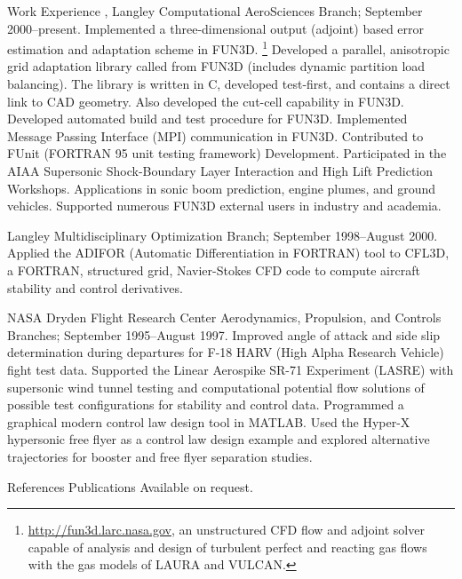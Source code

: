 \documentclass{resume}
\begin{document}
\begin{category}{Work Experience}
, Langley Computational AeroSciences Branch;
September 2000--present.
Implemented a three-dimensional output (adjoint) based error
estimation and adaptation scheme in FUN3D.%
\footnote{\url{http://fun3d.larc.nasa.gov}, an unstructured CFD flow and adjoint solver capable of analysis and
design of turbulent perfect and reacting gas flows with the gas models of LAURA and VULCAN.
} 
Developed a parallel, anisotropic grid adaptation
library called from FUN3D (includes dynamic partition load balancing).
The library is
written in C, developed test-first, and contains a direct link to CAD geometry.
Also developed the cut-cell capability in FUN3D.
Developed automated build and test procedure for FUN3D.
Implemented Message Passing Interface (MPI) communication in FUN3D.
Contributed to FUnit (FORTRAN 95 unit testing framework) Development.
Participated in the AIAA Supersonic Shock-Boundary Layer Interaction and High Lift Prediction Workshops.
Applications in sonic boom prediction, engine plumes, and ground vehicles.
Supported numerous FUN3D external users in industry and academia.

 Langley Multidisciplinary Optimization Branch;
September 1998--August 2000.
Applied the ADIFOR (Automatic Differentiation in FORTRAN) tool to
CFL3D, a FORTRAN, structured grid, Navier-Stokes CFD code to compute
aircraft stability and control derivatives.

NASA Dryden Flight Research Center Aerodynamics, Propulsion, and Controls
Branches; September 1995--August 1997. 
Improved angle of attack and
side slip determination during departures for F-18 HARV (High Alpha
Research Vehicle) fight test data. Supported the Linear Aerospike
SR-71 Experiment (LASRE) with supersonic wind tunnel testing and
computational potential flow solutions of possible test configurations
for stability and control data. Programmed a graphical modern control
law design tool in MATLAB. Used the Hyper-X hypersonic free flyer as a
control law design example and explored alternative trajectories for
booster and free flyer separation studies.


\end{category}


\begin{category}{References Publications} 
\citemnobullet Available on request.
\end{category}
\end{document}
